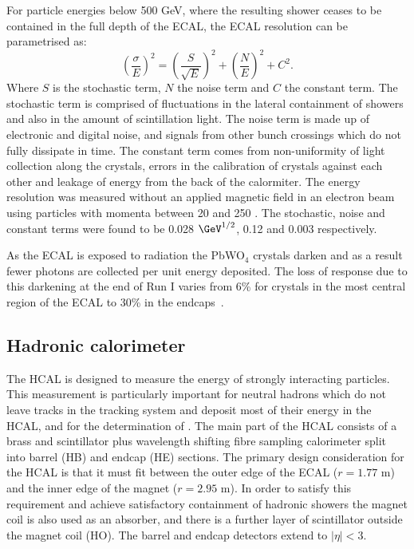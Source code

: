 For particle energies below 500 GeV, where the resulting shower ceases to be contained in the full depth of the \ac{ECAL}, the \ac{ECAL} resolution can be parametrised as:
\begin{equation}
  \label{eq:ecalres}
  \left(\frac{\sigma}{E}\right)^2=\left(\frac{S}{\sqrt{E}}\right)^2+\left(\frac{N}{E}\right)^2+C^2.
\end{equation}
Where $S$ is the stochastic term, $N$ the noise term and $C$ the constant term. The stochastic term is comprised of fluctuations in the lateral containment of showers and also in the amount of scintillation light. The noise term is made up of electronic and digital noise, and signals from other bunch crossings which do not fully dissipate in time. The constant term comes from non-uniformity of light collection along the crystals, errors in the calibration of crystals against each other and leakage of energy from the back of the calormiter. The energy resolution was measured without an applied magnetic field in an electron beam using particles with momenta between 20 and 250 \GeV. The stochastic, noise and constant terms were found to be 0.028 $\GeV^{1/2}$, 0.12 \GeV and 0.003 respectively.

As the \ac{ECAL} is exposed to radiation the PbWO$_{4}$ crystals darken and as a result fewer photons are collected per unit energy deposited. The loss of response due to this darkening at the end of Run I varies from 6\% for crystals in the most central region of the \ac{ECAL} to 30\% in the endcaps~\cite{CMS-DP-2015-063}.

 

\subsection{Hadronic calorimeter}
\label{sec:HCAL}
The \ac{HCAL} is designed to measure the energy of strongly interacting particles. This measurement is particularly important for neutral hadrons which do not leave tracks in the tracking system and deposit most of their energy in the \ac{HCAL}, and for the determination of \MET.  The main part of the \ac{HCAL} consists of a brass and scintillator plus wavelength shifting fibre sampling calorimeter split into barrel (\ac{HB}) and endcap (\ac{HE}) sections. The primary design consideration for the \ac{HCAL} is that it must fit between the outer edge of the \ac{ECAL} ($r=1.77$ m) and the inner edge of the magnet ($r=2.95$ m). In order to satisfy this requirement and achieve satisfactory containment of hadronic showers the magnet coil is also used as an absorber, and there is a further layer of scintillator outside the magnet coil (\ac{HO}). The barrel and endcap detectors extend to $|\eta|<3$.

